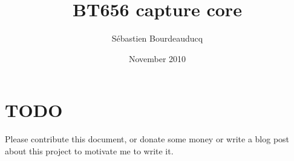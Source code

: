 \documentclass[a4paper,11pt]{article}
\title{BT656 capture core}
\author{S\'ebastien Bourdeauducq}
\date{November 2010}
\begin{document}
\setlength{\parindent}{0pt}
\setlength{\parskip}{5pt}
\maketitle{}
\section{TODO}

Please contribute this document, or donate some money or write a blog post about this project to motivate me to write it.

\end{document}
